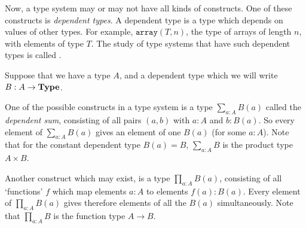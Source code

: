 Now, a type system may or may not have all kinds of constructs. One of these constructs is \textit{dependent types}. A dependent type is a type which depends on values of other types. For example, $ \mathtt{array}(T, n) $, the type of arrays of length $ n $, with elements of type $ T $. The study of type systems that have such dependent types is called .

Suppose that we have a type $ A $, and a dependent type which we will write $ B: A \to \mathbf{Type} $.

One of the possible constructs in a type system is a type $ \sum_{a: A} B(a) $ called the \textit{dependent sum}, consisting of all pairs $ (a, b) $ with $ a : A $ and $ b: B(a) $. So every element of $ \sum_{a: A} B(a) $ gives an element of one $ B(a) $ (for some $ a : A $). Note that for the constant dependent type $ B(a) = B $, $ \sum_{a: A} B $ is the product type $ A \times B $.

Another construct which may exist, is a type $ \prod_{a: A} B(a) $, consisting of all `functions' $ f $ which map elements $ a: A $ to elements $ f(a): B(a) $. Every element of $ \prod_{a: A} B(a) $ gives therefore elements of all the $ B(a) $ simultaneously. Note that $ \prod_{a: A} B $ is the function type $ A \to B $.

